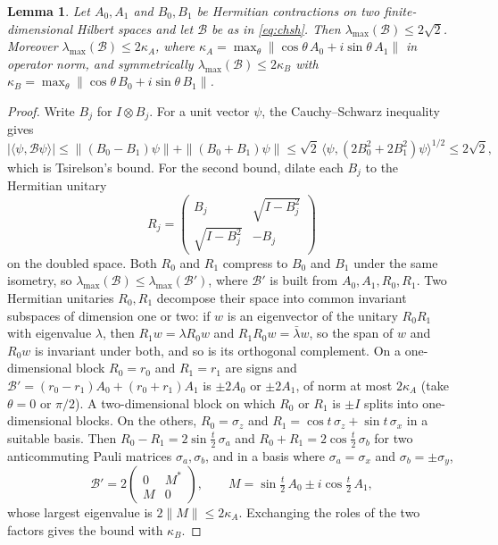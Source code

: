 \documentclass[11pt,a4paper]{article}
\newtheorem{lemma}[theorem]{Lemma}
\theoremstyle{definition}
\theoremstyle{plain}
\newcommand{\B}{\mathcal B}
\begin{document}
\begin{lemma}\label{lem:tsirelson}
Let $A_0,A_1$ and $B_0,B_1$ be Hermitian contractions on two
finite-dimensional Hilbert spaces and let $\B$ be as in \eqref{eq:chsh}. Then
$\lambda_{\max}(\B)\leq2\sqrt2$. Moreover $\lambda_{\max}(\B)\leq2\kappa_A$,
where $\kappa_A=\max_\theta\|\cos\theta\,A_0+i\sin\theta\,A_1\|$ in operator
norm, and
symmetrically $\lambda_{\max}(\B)\leq2\kappa_B$ with
$\kappa_B=\max_\theta\|\cos\theta\,B_0+i\sin\theta\,B_1\|$.
\end{lemma}

\begin{proof}
Write $B_j$ for $I\otimes B_j$. For a unit vector $\psi$, the Cauchy--Schwarz
inequality gives
\[
 |\langle\psi,\B\psi\rangle|\leq\|(B_0-B_1)\psi\|+\|(B_0+B_1)\psi\|
 \leq\sqrt2\,\langle\psi,(2B_0^2+2B_1^2)\psi\rangle^{1/2}\leq2\sqrt2 ,
\]
which is Tsirelson's bound. For the second bound, dilate each $B_j$ to the
Hermitian unitary
\[
 R_j=\begin{pmatrix}B_j&\sqrt{I-B_j^2}\\\sqrt{I-B_j^2}&-B_j\end{pmatrix}
\]
on the doubled space. Both $R_0$ and $R_1$ compress to $B_0$ and $B_1$ under
the same isometry, so $\lambda_{\max}(\B)\leq\lambda_{\max}(\B')$, where
$\B'$ is built from $A_0,A_1,R_0,R_1$. Two Hermitian unitaries $R_0,R_1$
decompose their space into common invariant subspaces of dimension one or
two: if $w$ is an eigenvector of the unitary $R_0R_1$ with eigenvalue
$\lambda$, then $R_1w=\lambda R_0w$ and $R_1R_0w=\bar\lambda w$, so the span
of $w$ and $R_0w$ is invariant under both, and so is its orthogonal
complement. On a one-dimensional block $R_0=r_0$ and $R_1=r_1$ are signs and
$\B'=(r_0-r_1)A_0+(r_0+r_1)A_1$ is $\pm2A_0$ or $\pm2A_1$, of norm at most
$2\kappa_A$ (take $\theta=0$ or $\pi/2$). A two-dimensional block on which
$R_0$ or $R_1$ is $\pm I$ splits into one-dimensional blocks. On the others,
$R_0=\sigma_z$ and $R_1=\cos t\,\sigma_z+\sin t\,\sigma_x$ in a suitable
basis. Then $R_0-R_1=2\sin\frac t2\,\sigma_a$ and
$R_0+R_1=2\cos\frac t2\,\sigma_b$ for two anticommuting Pauli matrices
$\sigma_a,\sigma_b$, and in a basis where $\sigma_a=\sigma_x$ and
$\sigma_b=\pm\sigma_y$,
\[
 \B'=2\begin{pmatrix}0&M^*\\M&0\end{pmatrix},\qquad
 M=\sin\tfrac t2\,A_0\pm i\cos\tfrac t2\,A_1 ,
\]
whose largest eigenvalue is $2\|M\|\leq2\kappa_A$. Exchanging the roles of
the two factors gives the bound with $\kappa_B$.
\end{proof}
\end{document}
